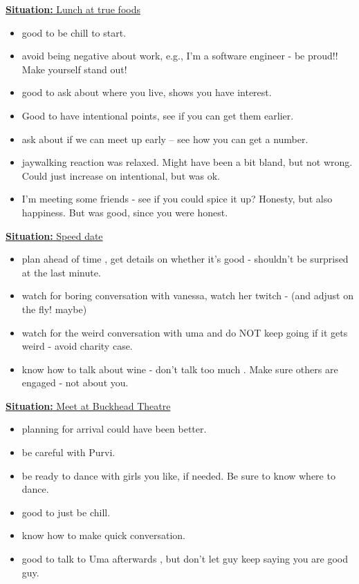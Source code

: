 \documentclass[11pt]{article}
\newcommand{\newSituation}[1]{\underline{\textbf{Situation:} #1} }
\begin{document}
\newSituation{Lunch at true foods}
\begin{itemize} 
\item good to be chill to start. 
\item avoid being negative about work, e.g., I'm a software engineer - be proud!!  Make yourself stand out! 
\item good to ask about where you live, shows you have interest. 
\item Good to have intentional points, see if you can get them earlier. 
\item ask about if we can meet up early -- see how you can get a number. 
\item jaywalking reaction was relaxed.  Might have been a bit bland, but not wrong. Could just increase on intentional, but was ok. 
\item I'm meeting some friends - see if you could spice it up? Honesty, but also happiness.  But was good, since you were honest. 
\end{itemize} 

\newSituation{Speed date} 
\begin{itemize} 
\item plan ahead of time , get details on whether it's good - shouldn't be surprised at the last minute. 
\item watch for boring conversation with vanessa, watch her twitch - (and adjust on the fly! maybe)
\item watch for the weird conversation with uma and do NOT keep going if it gets weird - avoid charity case. 
\item know how to talk about wine - don't talk too much  .  Make sure others are engaged - not about you. 
\end{itemize}  

\newSituation{Meet at Buckhead Theatre} 
\begin{itemize} 
\item planning for arrival could have been better. 
\item be careful with Purvi. 
\item be ready to dance with girls you like, if needed. Be sure to know where to dance. 
\item good to just be chill. 
\item know how to make quick conversation. 
\item good to talk to Uma afterwards  , but don't let guy keep saying you are good guy. 
\end{itemize} 
\end{document}
